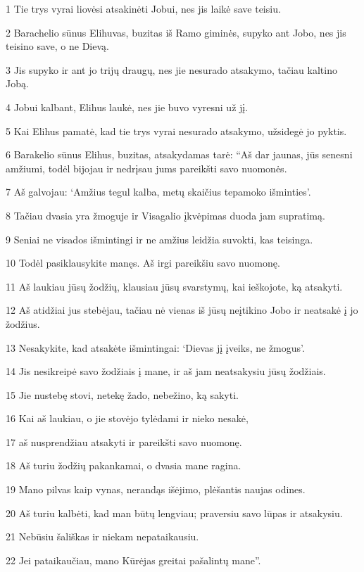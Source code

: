 \par 1 Tie trys vyrai liovėsi atsakinėti Jobui, nes jis laikė save teisiu. 
\par 2 Barachelio sūnus Elihuvas, buzitas iš Ramo giminės, supyko ant Jobo, nes jis teisino save, o ne Dievą. 
\par 3 Jis supyko ir ant jo trijų draugų, nes jie nesurado atsakymo, tačiau kaltino Jobą. 
\par 4 Jobui kalbant, Elihus laukė, nes jie buvo vyresni už jį. 
\par 5 Kai Elihus pamatė, kad tie trys vyrai nesurado atsakymo, užsidegė jo pyktis. 
\par 6 Barakelio sūnus Elihus, buzitas, atsakydamas tarė: “Aš dar jaunas, jūs senesni amžiumi, todėl bijojau ir nedrįsau jums pareikšti savo nuomonės. 
\par 7 Aš galvojau: ‘Amžius tegul kalba, metų skaičius tepamoko išminties’. 
\par 8 Tačiau dvasia yra žmoguje ir Visagalio įkvėpimas duoda jam supratimą. 
\par 9 Seniai ne visados išmintingi ir ne amžius leidžia suvokti, kas teisinga. 
\par 10 Todėl pasiklausykite manęs. Aš irgi pareikšiu savo nuomonę. 
\par 11 Aš laukiau jūsų žodžių, klausiau jūsų svarstymų, kai ieškojote, ką atsakyti. 
\par 12 Aš atidžiai jus stebėjau, tačiau nė vienas iš jūsų neįtikino Jobo ir neatsakė į jo žodžius. 
\par 13 Nesakykite, kad atsakėte išmintingai: ‘Dievas jį įveiks, ne žmogus’. 
\par 14 Jis nesikreipė savo žodžiais į mane, ir aš jam neatsakysiu jūsų žodžiais. 
\par 15 Jie nustebę stovi, netekę žado, nebežino, ką sakyti. 
\par 16 Kai aš laukiau, o jie stovėjo tylėdami ir nieko nesakė, 
\par 17 aš nusprendžiau atsakyti ir pareikšti savo nuomonę. 
\par 18 Aš turiu žodžių pakankamai, o dvasia mane ragina. 
\par 19 Mano pilvas kaip vynas, nerandąs išėjimo, plėšantis naujas odines. 
\par 20 Aš turiu kalbėti, kad man būtų lengviau; praversiu savo lūpas ir atsakysiu. 
\par 21 Nebūsiu šališkas ir niekam nepataikausiu. 
\par 22 Jei pataikaučiau, mano Kūrėjas greitai pašalintų mane”.



